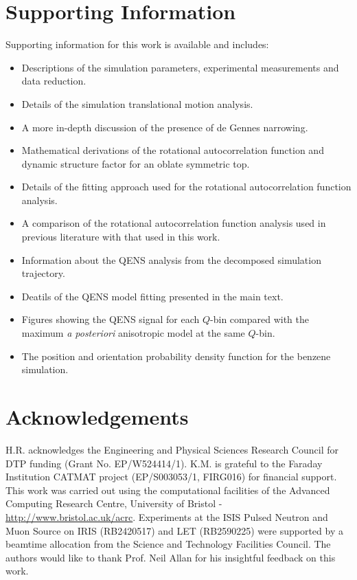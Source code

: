 \documentclass[reprint,
               superscriptaddress,
               nobibnotes,
               amsmath,
               amssymb,
               aps,
               hidelinks, 
               pre]{revtex4-2}
\begin{document}
\section*{Supporting Information} 

Supporting information for this work is available and includes: 
\begin{itemize}
    \item Descriptions of the simulation parameters, experimental measurements and data reduction.
    \item Details of the simulation translational motion analysis. 
    \item A more in-depth discussion of the presence of de Gennes narrowing.
    \item Mathematical derivations of the rotational autocorrelation function and dynamic structure factor for an oblate symmetric top.
    \item Details of the fitting approach used for the rotational autocorrelation function analysis. 
    \item A comparison of the rotational autocorrelation function analysis used in previous literature with that used in this work. 
    \item Information about the QENS analysis from the decomposed simulation trajectory. 
    \item Deatils of the QENS model fitting presented in the main text. 
    \item Figures showing the QENS signal for each $Q$-bin compared with the maximum \emph{a posteriori} anisotropic model at the same $Q$-bin. 
    \item The position and orientation probability density function for the benzene simulation. 
\end{itemize}

\section*{Acknowledgements}

H.R. acknowledges the Engineering and Physical Sciences Research Council for DTP funding (Grant No. EP/W524414/1).
K.M. is grateful to the Faraday Institution CATMAT project (EP/S003053/1, FIRG016) for financial support. 
This work was carried out using the computational facilities of the Advanced Computing Research Centre, University of Bristol - \href{http://www.bristol.ac.uk/acrc/}{http://www.bristol.ac.uk/acrc}.
Experiments at the ISIS Pulsed Neutron and Muon Source on IRIS (RB2420517) and LET (RB2590225) were supported by a beamtime allocation from the Science and Technology Facilities Council.
The authors would like to thank Prof. Neil Allan for his insightful feedback on this work. 
\end{document}
